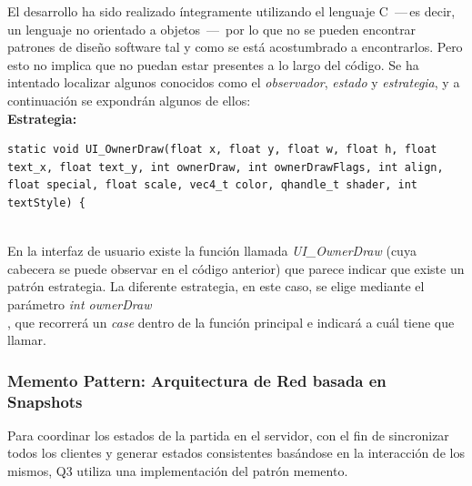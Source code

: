 \documentclass[a4paper,12pt]{report}
\begin{document}
	El desarrollo ha sido realizado íntegramente utilizando el lenguaje C \,---\,es decir, un lenguaje no orientado a objetos \,---\, por lo que no se pueden encontrar patrones de diseño software tal y como se está acostumbrado a encontrarlos. Pero esto no implica que no puedan estar presentes a lo largo del código. Se ha intentado localizar algunos conocidos como el \textit{observador}, \textit{estado} y \textit{estrategia}, y a continuación se expondrán algunos de ellos:\\
	
	
	\textbf{Estrategia:}
	\begin{lstlisting}[style=C, numbers=none]
static void UI_OwnerDraw(float x, float y, float w, float h, float text_x, float text_y, int ownerDraw, int ownerDrawFlags, int align, float special, float scale, vec4_t color, qhandle_t shader, int textStyle) {
	
	\end{lstlisting}
	
	En la interfaz de usuario existe la función llamada \textit{UI\_OwnerDraw} (cuya cabecera se puede observar en el código anterior) que parece indicar que existe un patrón estrategia. La diferente estrategia, en este caso, se elige mediante el parámetro \textit{int ownerDraw}\\, que recorrerá un \textit{case} dentro de la función principal e indicará a cuál tiene que llamar.\\
	
	

	
	
	
    \subsubsection{Memento Pattern: Arquitectura de Red basada en Snapshots}
	Para coordinar los estados de la partida en el servidor, con el fin de sincronizar todos los clientes y generar estados consistentes basándose en la interacción de los mismos, Q3 utiliza una implementación del patrón memento.\\
	
\end{document}
